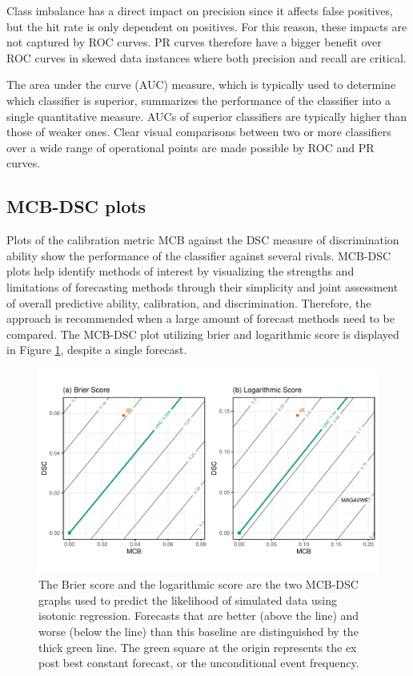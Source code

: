 \documentclass[a4paper,12pt]{article}
\numberwithin{equation}{section}
\begin{document}
   Class imbalance has a direct impact on precision since it affects false positives, but the hit rate is only dependent on positives. For this reason, these impacts are not captured by ROC curves. PR curves therefore have a bigger benefit over ROC curves in skewed data instances where both precision and recall are critical.\bigskip 
   
   The area under the curve (AUC) measure, which is typically used to determine which classifier is superior, summarizes the performance of the classifier into a single quantitative measure. AUCs of superior classifiers are typically higher than those of weaker ones. Clear visual comparisons between two or more classifiers over a wide range of operational points are made possible by ROC and PR curves.

   \subsection{MCB-DSC plots}
   Plots of the calibration metric MCB against the DSC measure of discrimination ability show the performance of the classifier against several rivals. MCB-DSC plots help identify methods of interest by visualizing the strengths and limitations of forecasting methods through their simplicity and joint assessment of overall predictive ability, calibration, and discrimination. Therefore, the approach is recommended when a large amount of forecast methods need to be compared. The MCB-DSC plot utilizing brier and logarithmic score is displayed in Figure \ref{fig:mcb}, despite a single forecast.

   \begin{figure}[hbt!]
      \centering
      \includegraphics[scale=0.7]{Plots_sim/mcb.pdf}
      \caption{The Brier score and the logarithmic score are the two MCB-DSC graphs used to predict the likelihood of simulated data using isotonic regression. Forecasts that are better (above the line) and worse (below the line) than this baseline are distinguished by the thick green line. The green square at the origin represents the ex post best constant forecast, or the unconditional event frequency.}
      \label{fig:mcb}
  \end{figure}
   
\end{document}
